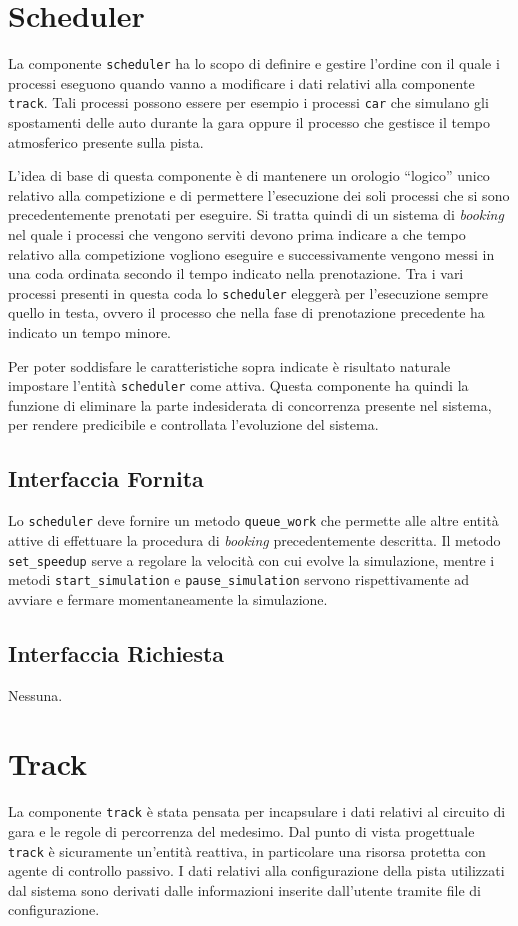 \documentclass[11pt,a4paper]{report}
\newcommand{\fun}[1]{\texttt{#1}}
\begin{document}
\section{Scheduler}
La componente \texttt{scheduler} ha lo scopo di definire e gestire l'ordine con il quale i processi eseguono quando vanno a modificare i dati relativi alla componente \texttt{track}.
Tali processi possono essere per esempio i processi \texttt{car} che simulano gli spostamenti delle auto durante la gara oppure il processo che gestisce il tempo atmosferico
presente sulla pista.

L'idea di base di questa componente è di mantenere un orologio ``logico'' unico relativo alla competizione e di permettere l'esecuzione dei soli processi che si sono precedentemente prenotati per eseguire. Si tratta quindi di un sistema di \textit{booking} nel quale i processi che vengono serviti devono prima indicare a che tempo relativo alla competizione vogliono eseguire e successivamente vengono messi in una coda ordinata secondo il tempo indicato nella prenotazione. Tra i vari processi presenti in questa coda lo \texttt{scheduler} eleggerà per l'esecuzione sempre quello in testa, ovvero il processo che nella fase di prenotazione precedente ha indicato un tempo minore.

Per poter soddisfare le caratteristiche sopra indicate è risultato naturale impostare l'entità \texttt{scheduler} come attiva.
Questa componente ha quindi la funzione di eliminare la parte indesiderata di concorrenza presente nel sistema, per rendere predicibile e controllata l'evoluzione del sistema.

\subsection*{Interfaccia Fornita}
Lo \texttt{scheduler} deve fornire un metodo \fun{queue\_work} che permette alle altre entità attive di effettuare la procedura di \textit{booking} precedentemente descritta.
Il metodo \fun{set\_speedup} serve a regolare la velocità con cui evolve la simulazione, mentre i metodi \fun{start\_simulation} e \fun{pause\_simulation} servono rispettivamente ad avviare e fermare momentaneamente la simulazione.

\subsection*{Interfaccia Richiesta}
Nessuna.

\section{Track}
La componente \texttt{track} è stata pensata per incapsulare i dati relativi al circuito di gara e le regole di percorrenza del medesimo. Dal punto di vista progettuale \texttt{track} è sicuramente un'entità reattiva, in particolare una risorsa protetta con agente di controllo passivo.
I dati relativi alla configurazione della pista utilizzati dal sistema sono derivati dalle informazioni inserite dall'utente tramite file di configurazione.
\end{document}

